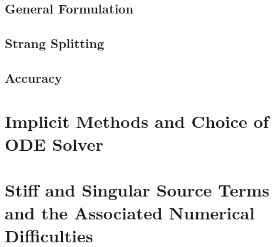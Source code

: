 \documentclass{beamer}
\begin{document}
\subsection{General Formulation}

















\subsection{Strang Splitting}





















\subsection{Accuracy}
















\section{Implicit Methods and Choice of ODE Solver}















\section{Stiff and Singular Source Terms and the Associated Numerical Difficulties}
\end{document}
